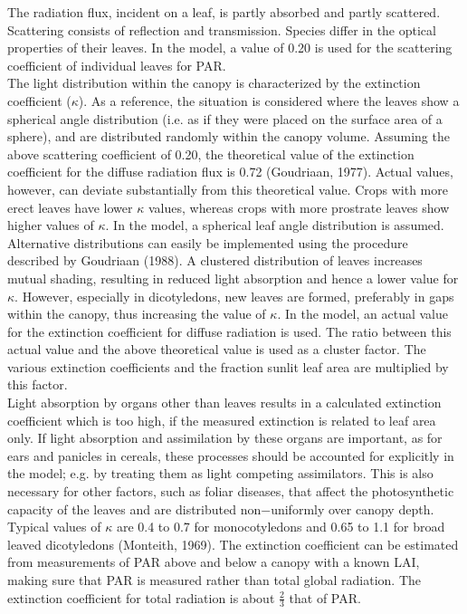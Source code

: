 \documentclass[11pt]{article}
\begin{document}
The radiation flux, incident on a leaf, is partly absorbed and partly scattered. Scatter\-ing
consists of reflection and transmission. Species differ in the optical properties of their
leaves. In the model, a value of 0.20 is used for the scattering coefficient of individual 
leaves for PAR. \\
The light distribution within the canopy is characterized by the extinction coefficient ($\kappa$).
As a reference, the situation is considered where the leaves show a spherical angle
distribution (i.e. as if they were placed on the surface area of a sphere), and are distrib\-uted randomly within the canopy volume. Assuming the above scattering coefficient of
0.20, the theoretical value of the extinction coefficient for the diffuse radiation flux is
0.72 (Goudriaan, 1977). Actual values, however, can deviate substan\-tially from this
theoretical value. Crops with more erect leaves have lower $\kappa$ values, whereas crops with
more prostrate leaves show higher values of $\kappa$. In the model, a spherical leaf angle
distribution is assumed. Alternative distributions can easily be implemented using the
procedure described by Goudriaan (1988). A clustered distribution of leaves increases
mutual shading, resulting in reduced light absorption and hence a lower value for $\kappa$.
However, especially in dicotyledons, new leaves are formed, preferably in gaps within the
canopy, thus increasing the value of $\kappa$. In the model, an actual value for the extinction
coefficient for diffuse radiation is used. The ratio between this actual value and the above
theoretical value is used as a cluster factor. The various extinction coefficients and the
fraction sunlit leaf area are multiplied by this factor.\\
Light absorption by organs other than leaves results in a calculated extinction coefficient
which is too high, if the measured extinction is related to leaf area only. If light absorp\-tion and assimilation by these organs are important, as for ears and panicles in cereals,
these processes should be accounted for explicitly in the model; e.g. by treating them as
light competing assimilators. This is also necessary for other factors, such as foliar
diseases, that affect the photosynthetic capacity of the leaves and are distributed
{\nobreak}non$-$uniformly over canopy depth. \\
Typical values of $\kappa$ are 0.4 to 0.7 for monocotyledons and 0.65 to 1.1 for broad leaved
{\nobreak}dicotyledons (Monteith, 1969). The extinction coefficient can be estimated from measure\-ments of PAR above and below a canopy with a known LAI, making sure that PAR is
measured rather than total global radiation. The extinction coefficient for total radiation is
about $\frac{2}{3}$ that of PAR. 
\end{document}
